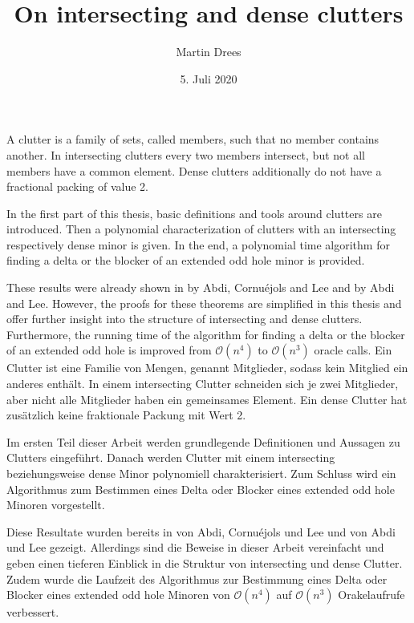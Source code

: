 \documentclass[a4paper, 12pt]{scrbook}
\author{Martin Drees}
\date{5. Juli 2020}
\title{On intersecting and dense clutters}
\theoremstyle{definition}
\begin{document}
\maketitle
{}
A clutter is a family of sets, called members, such that no member contains another.
In intersecting clutters every two members intersect, but not all members have a common element. Dense clutters additionally do not have a fractional packing of value 2.

In the first part of this thesis, basic definitions and tools around clutters are introduced.
Then a polynomial characterization of clutters with an intersecting respectively dense minor is given.
In the end, a polynomial time algorithm for finding a delta or the blocker of an extended odd hole minor is provided.

These results were already shown in  by Abdi, Cornuéjols and Lee and  by Abdi and Lee.
However, the proofs for these theorems are simplified in this thesis and offer further insight into the structure of intersecting and dense clutters.
Furthermore, the running time of the algorithm for finding a delta or the blocker of an extended odd hole is improved from $\mathcal{O}(n^4)$ to $\mathcal{O}(n^3)$ oracle calls.
{\let\cleardoublepage\relax {}}
Ein Clutter ist eine Familie von Mengen, genannt Mitglieder, sodass kein Mitglied ein anderes enthält. In einem intersecting Clutter schneiden sich je zwei Mitglieder, aber nicht alle Mitglieder haben ein gemeinsames Element.
Ein dense Clutter hat zusätzlich keine fraktionale Packung mit Wert 2.

Im ersten Teil dieser Arbeit werden grundlegende Definitionen und Aussagen zu Clutters eingeführt. Danach werden Clutter mit einem intersecting beziehungsweise dense Minor polynomiell charakterisiert. Zum Schluss wird ein Algorithmus zum Bestimmen eines Delta oder Blocker eines extended odd hole Minoren vorgestellt.

Diese Resultate wurden bereits in  von Abdi, Cornuéjols und Lee und  von Abdi und Lee gezeigt. Allerdings sind die Beweise in dieser Arbeit vereinfacht und geben einen tieferen Einblick in die Struktur von intersecting und dense Clutter. Zudem wurde die Laufzeit des Algorithmus zur Bestimmung eines Delta oder Blocker eines extended odd hole Minoren von $\mathcal{O}(n^4)$ auf $\mathcal{O}(n^3)$ Orakelaufrufe verbessert.
\end{document}
